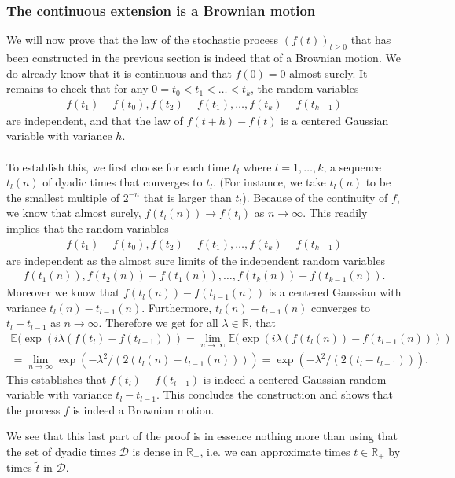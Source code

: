 \documentclass[../mainfile.tex]{subfiles}
\begin{document}
\subsubsection{The continuous extension is a Brownian motion}
We will now prove that the law of the stochastic process $(f(t))_{t \geq 0}$ that has been constructed in the previous section is indeed that of a Brownian motion. We do already know that it is continuous and that $f(0)=0$ almost surely. It remains to check that for any $0=t_0<t_1< \dots < t_k$, the random variables 
\begin{align*}
f(t_1)-f(t_0),f(t_2)-f(t_1), \dots , f(t_k)-f(t_{k-1})
\end{align*}
are independent, and that the law of $f(t+h)-f(t)$ is a centered Gaussian variable with variance $h$. \\
\\
To establish this, we first choose for each time $t_l$ where $l=1, \dots,k$, a sequence $t_l(n)$ of dyadic times that converges to $t_l$. (For instance, we take $t_l(n)$ to be the smallest multiple of $2^{-n}$ that is larger than $t_l$). Because of the continuity of $f$, we know that almost surely, $f(t_l(n)) \to f(t_l)$ as $n \to \infty$. This readily implies that the random variables 
\begin{align*}
f(t_1)-f(t_0),f(t_2)-f(t_1), \dots , f(t_k)-f(t_{k-1})
\end{align*}
are independent as the almost sure limits of the independent random variables
\begin{align*}
f(t_1(n)),f(t_2(n))-f(t_1(n)), \dots , f(t_k(n))-f(t_{k-1}(n)).
\end{align*}
Moreover we know that $f(t_l(n))-f(t_{l-1}(n))$ is a centered Gaussian with variance $t_l(n)-t_{l-1}(n)$. Furthermore, $t_l(n)-t_{l-1}(n)$ converges to $t_l-t_{l-1}$ as $n \to \infty$. Therefore we get for all $\lambda \in \mathbb{R}$,  that
\begin{align*}
\mathbb{E}( \exp(i \lambda (f(t_l)-f(t_{l-1}))) = \lim_{n \to \infty} \mathbb{E}( \exp(i \lambda (f(t_l(n))-f(t_{l-1}(n)))) \\
= \lim_{n \to \infty} \exp( - \lambda^2/(2(t_l(n)-t_{l-1}(n)))) = \exp( - \lambda^2/(2(t_l-t_{l-1}))).
\end{align*}
This establishes that $f(t_l)-f(t_{l-1})$ is indeed a centered Gaussian random variable with variance $t_l-t_{l-1}$. This concludes the construction and shows that the process $f$ is indeed a Brownian motion. 
\begin{rem} We see that this last part of the proof is in essence nothing more than using that the set of dyadic times $\mathcal{D}$ is dense in $\mathbb{R}_+$, i.e. we can approximate times $t \in \mathbb{R}_+$ by times $\tilde{t}$ in $\mathcal{D}$.
\end{rem}
\newpage
\end{document}
